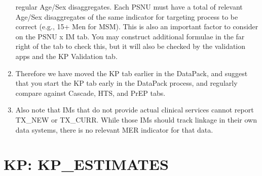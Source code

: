 \documentclass[
  openany]{book}
\begin{document}
\begin{enumerate}
  regular Age/Sex disaggregates. Each PSNU must have a total of
  relevant Age/Sex disaggregates of the same indicator for targeting
  process to be correct (e.g., 15+ Men for MSM). This is also an
  important factor to consider on the PSNU x IM tab. You may construct
  additional formulae in the far right of the tab to check this, but
  it will also be checked by the validation apps and the KP Validation
  tab.
\item
  Therefore we have moved the KP tab earlier in the DataPack, and
  suggest that you start the KP tab early in the DataPack process, and
  regularly compare against Cascade, HTS, and PrEP tabs.
\item
  Also note that IMs that do not provide actual clinical services
  cannot report TX\_NEW or TX\_CURR. While those IMs should track
  linkage in their own data systems, there is no relevant MER
  indicator for that data.
\end{enumerate}

\hypertarget{kp-kp_estimates}{%
\section{KP: KP\_ESTIMATES}\label{kp-kp_estimates}}

\begin{table}
\centering\begingroup\fontsize{12}{14}\selectfont

\endgroup{}
\end{table}
\end{document}
